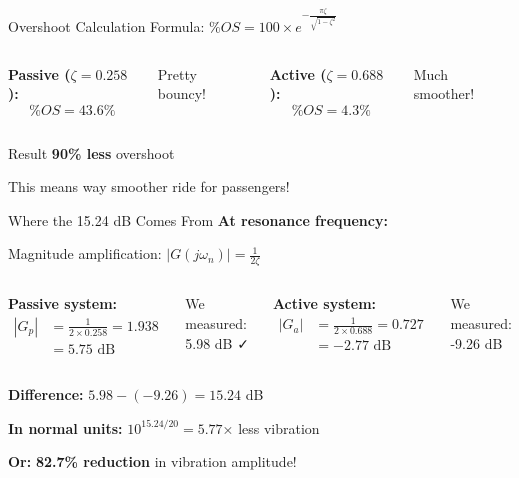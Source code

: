 \documentclass[aspectratio=169]{beamer}
\begin{document}
\begin{frame}{Overshoot Calculation}
  Formula: $\%OS = 100 \times e^{-\frac{\pi \zeta}{\sqrt{1-\zeta^2}}}$
  
  \vspace{0.3cm}
  
  \begin{columns}
    \textbf{Passive ($\zeta = 0.258$):}
    \begin{equation}
      \%OS = 43.6\%
    \end{equation}
    
    Pretty bouncy!
    
    \textbf{Active ($\zeta = 0.688$):}
    \begin{equation}
      \%OS = 4.3\%
    \end{equation}
    
    Much smoother!
  \end{columns}
  
  \vspace{0.5cm}
  
  \begin{alertblock}{Result}
    \Large \textbf{90\% less} overshoot
  \end{alertblock}
  
  \vspace{0.3cm}
  
  This means way smoother ride for passengers!
\end{frame}

\begin{frame}{Where the 15.24 dB Comes From}
  \textbf{At resonance frequency:}
  
  Magnitude amplification: $|G(j\omega_n)| = \frac{1}{2\zeta}$
  
  \vspace{0.3cm}
  
  \begin{columns}
    \textbf{Passive system:}
    \begin{align}
      |G_p| &= \frac{1}{2 \times 0.258} = 1.938 \\
      &= 5.75 \text{ dB}
    \end{align}
    
    We measured: 5.98 dB ✓
    
    \textbf{Active system:}
    \begin{align}
      |G_a| &= \frac{1}{2 \times 0.688} = 0.727 \\
      &= -2.77 \text{ dB}
    \end{align}
    
    We measured: -9.26 dB
  \end{columns}
  
  \vspace{0.4cm}
  
  \textbf{Difference:} $5.98 - (-9.26) = 15.24$ dB
  
  \textbf{In normal units:} $10^{15.24/20} = 5.77$× less vibration
  
  \textbf{Or:} \textbf{82.7\% reduction} in vibration amplitude!
\end{frame}
\end{document}

